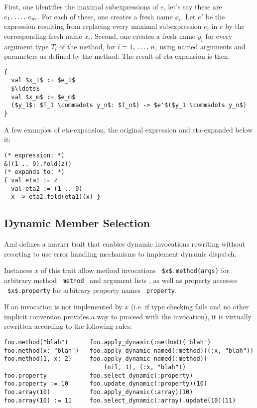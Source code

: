 First, one identifies the maximal subexpressions of $e$, let's say these are $e_1 ,\, \ldots ,\, e_m$. For each of these, one creates a fresh name $x_i$. Let $e'$ be the expression resulting from replacing every maximal subexpression $e_i$ in $e$ by the corresponding fresh name $x_i$. Second, one creates a fresh name $y_i$ for every argument type $T_i$ of the method, for $i = 1 ,\, \ldots ,\, n$, using named arguments and parameters as defined by the method. The result of eta-expansion is then: 
\begin{lstlisting}
{
  val $x_1$ := $e_1$
  $\ldots$
  val $x_m$ := $e_m$
  ($y_1$: $T_1 \commadots y_n$: $T_n$) -> $e'$($y_1 \commadots y_n$)
}
\end{lstlisting}

\example A few examples of eta-expansion, the original expression and eta-expanded below it:
\begin{lstlisting}
(* expression: *)
&((1 .. 9).fold(z))
(* expands to: *)
{ val eta1 := z
  val eta2 := (1 .. 9)
  x -> eta2.fold(eta1)(x) }
\end{lstlisting}







\subsection{Dynamic Member Selection}
\label{sec:dynamic-member-selection}

Aml defines a marker trait  that enables dynamic invocations rewriting without resorting to use error handling mechanisms to implement dynamic dispatch. 

Instances $x$ of this trait allow method invocations ~\lstinline[deletekeywords={method}]!$x$.method(args)! for arbitrary method ~\lstinline[deletekeywords={method}]!method!~ and argument lists , as well as property accesses ~\lstinline[deletekeywords={property}]!$x$.property! for arbitrary property names ~\lstinline[deletekeywords={property}]!property!. 

If an invocation is not implemented by $x$ (i.e. if type checking fails and no other implicit conversion provides a way to proceed with the invocation), it is virtually rewritten according to the following rules:

\begin{lstlisting}[deletekeywords={property,method}]
foo.method("blah")      foo.apply_dynamic(:method)("blah")
foo.method(x: "blah")   foo.apply_dynamic_named(:method)((:x, "blah"))
foo.method(1, x: 2)     foo.apply_dynamic_named(:method)(
                            (nil, 1), (:x, "blah"))
foo.property            foo.select_dynamic(:property)
foo.property := 10      foo.update_dynamic(:property)(10)
foo.array(10)           foo.apply_dynamic(:array)(10)
foo.array(10) := 11     foo.select_dynamic(:array).update(10)(11)
\end{lstlisting}











